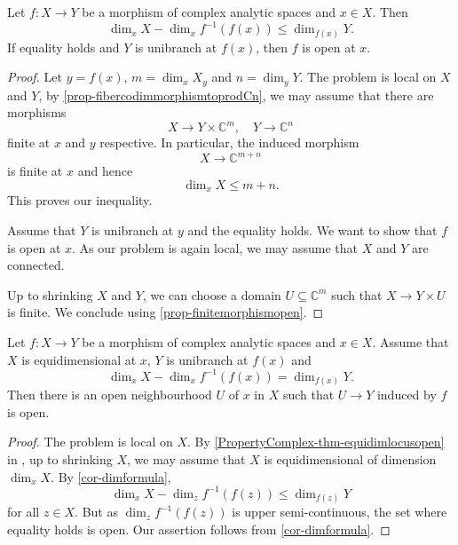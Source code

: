 \begin{corollary}\label{cor-dimformula}
    Let $f:X\rightarrow Y$ be a morphism of complex analytic spaces and $x\in X$. Then
    \[
        \dim_x X-\dim_x f^{-1}(f(x))\leq \dim_{f(x)}Y.  
    \]
    If equality holds and $Y$ is unibranch at $f(x)$, then $f$ is open at $x$.
\end{corollary}
\begin{proof}
    Let $y=f(x)$, $m=\dim_x X_y$ and $n=\dim_y Y$. The problem is local on $X$ and $Y$, by \cref{prop-fibercodimmorphismtoprodCn}, we may assume that there are morphisms 
    \[
        X\rightarrow Y\times \mathbb{C}^m,\quad Y\rightarrow \mathbb{C}^n  
    \]
    finite at $x$ and $y$ respective. In particular, the induced morphism
    \[
        X\rightarrow  \mathbb{C}^{m+n} 
    \]
    is finite at $x$ and hence
    \[
        \dim_x X\leq m+n.  
    \]
    This proves our inequality. 

    Assume that $Y$ is unibranch at $y$ and the equality holds. We want to show that $f$ is open at $x$.
    As our problem is again local, we may assume that $X$ and $Y$ are connected.

    Up to shrinking $X$ and $Y$, we can choose a domain $U\subseteq \mathbb{C}^m$ such that $X\rightarrow Y\times U$ is finite. We conclude using \cref{prop-finitemorphismopen}.
\end{proof}

\begin{corollary}\label{cor-dimformulaimpliesopen}
    Let $f:X\rightarrow Y$ be a morphism of complex analytic spaces and $x\in X$. Assume that $X$ is equidimensional at $x$, $Y$ is unibranch at $f(x)$ and
    \[
        \dim_x X-\dim_x f^{-1}(f(x))= \dim_{f(x)}Y.
    \] 
    Then there is an open neighbourhood $U$ of $x$ in $X$ such that $U\rightarrow Y$ induced by $f$ is open.
\end{corollary}
\begin{proof}
    The problem is local on $X$. By \cref{PropertyComplex-thm-equidimlocusopen} in , up to shrinking $X$, we may assume that $X$ is equidimensional of dimension $\dim_x X$. By \cref{cor-dimformula}, 
    \[
        \dim_x X-\dim_z f^{-1}(f(z))\leq \dim_{f(z)}Y
    \] 
    for all $z\in X$. But as $\dim_z f^{-1}(f(z))$ is upper semi-continuous, the set where equality holds is open. Our assertion follows from \cref{cor-dimformula}.
\end{proof}


